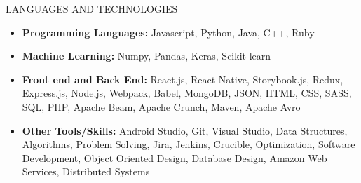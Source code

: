 \documentclass[]{mcdowellcv}
\begin{document}
	\begin{cvsection}{LANGUAGES AND TECHNOLOGIES}
		\begin{cvsubsection}{}{}{}
			\begin{itemize}
				\item \textbf{Programming Languages:} Javascript, Python, Java, C++, Ruby
				\item \textbf{Machine Learning:} Numpy, Pandas, Keras, Scikit-learn
				\item \textbf{Front end and Back End:} React.js, React Native, Storybook.js, Redux, Express.js, Node.js, Webpack, Babel, MongoDB, JSON, HTML, CSS, SASS, SQL, PHP, Apache Beam, Apache Crunch, Maven, Apache Avro
				\item \textbf{Other Tools/Skills:} Android Studio, Git, Visual Studio, Data Structures, Algorithms, Problem Solving, Jira, Jenkins, Crucible, Optimization, Software Development, Object Oriented Design, Database Design, Amazon Web Services, Distributed Systems
			\end{itemize}
		\end{cvsubsection}
	\end{cvsection}
\end{document}
